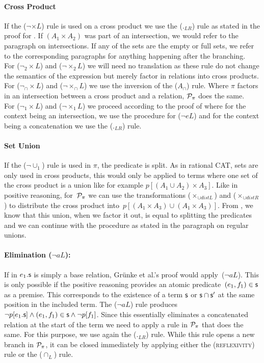 \documentclass[a4paper,twoside,12pt, english]{article}
\begin{document}
\paragraph{Cross Product} If the ($\neg {\times}L$) rule is used on a cross product we use the ($._{LR}$) rule as stated in the proof for .
If $(A_1 \times A_2)$ was part of an intersection, we would refer to the paragraph on intersections.
If any of the sets are the empty or full sets, we refer to the corresponding paragraphs for anything happening after the branching. \\
For ($\neg_2 {\times}L$) and ($\neg {\times}_2L$) we will need no translation as these rule do not change the semantics of the expression but merely factor in relations into cross products. \\
For ($\neg_\cap {\times}L$) and ($\neg {\times}_\cap L$) we use the inversion of the ($A_\cap$) rule. Where $\pi$ factors in an intersection between a cross product and a relation, $\mathcal{P}_\pi$ does the same. \\
For ($\neg_1 {\times}L$) and ($\neg{\times}_1 L$) we proceed according to the proof of  where for the context being an intersection, we use the procedure for ($\neg eL$) and for the context being a concatenation we use the ($._{LR}$) rule.

\paragraph{Set Union} If the ($\neg \cup_1$) rule is used in $\pi$, the predicate is split. As in rational CAT, sets are only used in cross products, this would only be applied to terms where one set of the cross product is a union like for example $p[(A_1 \cup A_2) \times A_3]$. Like in positive reasoning, for~$\mathcal{P}_\pi$ we can use the transformations ($\times_{\cup distL}$) and ($\times_{\cup distR}$) to distribute the cross product into~$p[(A_1 \times A_3) \cup (A_1 \times A_3)]$. From , we know that this union, when we factor it out, is equal to splitting the predicates and we can continue with the procedure as stated in the paragraph on regular unions.

\paragraph{Elimination ($\neg aL$):} If \rels{} in $e_1.\textsf{\upshape s}$ is simply a base relation, Grünke et al.'s proof would apply~($\neg aL$). This is only possible if the positive reasoning provides an atomic predicate~$(e_1,f_1) \in \textsf{\upshape s}$ as a premise. This corresponds to the existence of a term $\textsf{\upshape s}$ or $\textsf{\upshape s} \cap \textsf{\upshape s}'$ at the same position in the included term. The ($\neg aL$) rule produces $\neg p[e_1.\textsf{\upshape s}] \land (e_1,f_1) \in \textsf{\upshape s} \land \neg p[f_1]$. Since this essentially eliminates a concatenated relation at the start of the term we need to apply a rule in $\mathcal{P}_\pi$ that does the same. For this purpose, we use again the ($._{LR}$) rule.\newpage
While this rule opens a new branch in $\mathcal{P}_\pi$, it can be closed immediately by applying either the (\textsc{reflexivity}) rule or the ($\cap_L$) rule.
\end{document}
